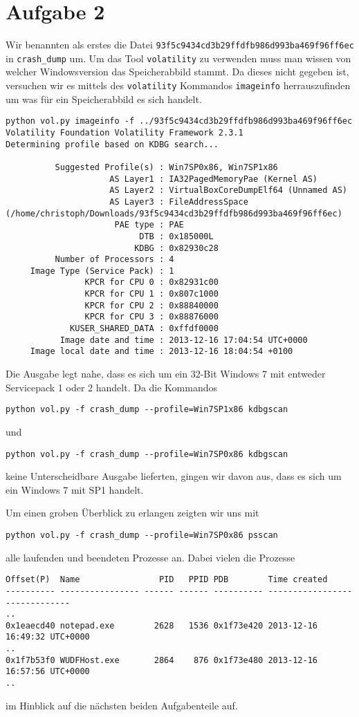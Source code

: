 \documentclass[10pt,a4paper]{article}
\begin{document}
\section*{Aufgabe 2}
Wir benannten als erstes die Datei \texttt{93f5c9434cd3b29ffdfb986d993ba469f96ff6ec} in \texttt{crash_dump} um.
Um das Tool \texttt{volatility} zu verwenden muss man wissen von welcher Windowsversion das Speicherabbild stammt. Da dieses nicht gegeben ist, versuchen wir es mittels des \texttt{volatility} Kommandos \texttt{imageinfo} herrauszufinden um was für ein Speicherabbild es sich handelt.
\begin{verbatim}
python vol.py imageinfo -f ../93f5c9434cd3b29ffdfb986d993ba469f96ff6ec
Volatility Foundation Volatility Framework 2.3.1
Determining profile based on KDBG search...

          Suggested Profile(s) : Win7SP0x86, Win7SP1x86
                     AS Layer1 : IA32PagedMemoryPae (Kernel AS)
                     AS Layer2 : VirtualBoxCoreDumpElf64 (Unnamed AS)
                     AS Layer3 : FileAddressSpace (/home/christoph/Downloads/93f5c9434cd3b29ffdfb986d993ba469f96ff6ec)
                      PAE type : PAE
                           DTB : 0x185000L
                          KDBG : 0x82930c28
          Number of Processors : 4
     Image Type (Service Pack) : 1
                KPCR for CPU 0 : 0x82931c00
                KPCR for CPU 1 : 0x807c1000
                KPCR for CPU 2 : 0x88840000
                KPCR for CPU 3 : 0x88876000
             KUSER_SHARED_DATA : 0xffdf0000
           Image date and time : 2013-12-16 17:04:54 UTC+0000
     Image local date and time : 2013-12-16 18:04:54 +0100
\end{verbatim}
Die Ausgabe legt nahe, dass es sich um ein 32-Bit Windows 7 mit entweder Servicepack 1 oder 2 handelt. Da die Kommandos
\begin{verbatim}
python vol.py -f crash_dump --profile=Win7SP1x86 kdbgscan
\end{verbatim}
und 
\begin{verbatim}
python vol.py -f crash_dump --profile=Win7SP0x86 kdbgscan
\end{verbatim}
keine Unterscheidbare Ausgabe lieferten, gingen wir davon aus, dass es sich um ein Windows 7 mit SP1 handelt.

Um einen groben Überblick zu erlangen zeigten wir uns mit 
\begin{verbatim}
python vol.py -f crash_dump --profile=Win7SP0x86 psscan
\end{verbatim}
alle laufenden und beendeten Prozesse an. Dabei vielen die Prozesse
\begin{verbatim}
Offset(P)  Name                PID   PPID PDB        Time created                   
---------- ---------------- ------ ------ ---------- ------------------------------
..
0x1eaecd40 notepad.exe        2628   1536 0x1f73e420 2013-12-16 16:49:32 UTC+0000
..
0x1f7b53f0 WUDFHost.exe       2864    876 0x1f73e480 2013-12-16 16:57:56 UTC+0000
..
\end{verbatim}
im Hinblick auf die nächsten beiden Aufgabenteile auf. 
\end{document}
